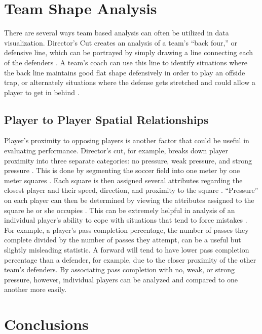 \documentclass[sigconf]{acmart}
\begin{document}
\section{Team Shape Analysis}

There are several ways team based analysis can often be utilized in data visualization. Director’s Cut creates an analysis of a team’s “back four,” or defensive line, which can be portrayed by simply drawing a line connecting each of the defenders \cite{directorscut}. A team’s coach can use this line to identify situations where the back line maintains good flat shape defensively in order to play an offside trap, or alternately situations where the defense gets stretched and could allow a player to get in behind \cite{directorscut}.

\subsection{Player to Player Spatial Relationships}

Player’s proximity to opposing players is another factor that could be useful in evaluating performance. Director’s cut, for example, breaks down player proximity into three separate categories: no pressure, weak pressure, and strong pressure \cite{directorscut}. This is done by segmenting the soccer field into one meter by one meter squares \cite{directorscut}. Each square is then assigned several attributes regarding the closest player and their speed, direction, and proximity to the square \cite{directorscut}. “Pressure” on each player can then be determined by viewing the attributes assigned to the square he or she occupies \cite{directorscut}. This can be extremely helpful in analysis of an individual player’s ability to cope with situations that tend to force mistakes \cite{directorscut}. For example, a player’s pass completion percentage, the number of passes they complete divided by the number of passes they attempt, can be a useful but slightly misleading statistic. A forward will tend to have lower pass completion percentage than a defender, for example, due to the closer proximity of the other team’s defenders. By associating pass completion with no, weak, or strong pressure, however, individual players can be analyzed and compared to one another more easily.

\section{Conclusions}
\end{document}
